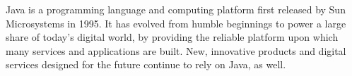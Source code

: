 Java is a programming language and computing platform first released by Sun Microsystems in 1995.
It has evolved from humble beginnings to power a large share of today's digital world,
by providing the reliable platform upon which many services and applications are built.
New, innovative products and digital services designed for the future continue to rely on Java, as well.

